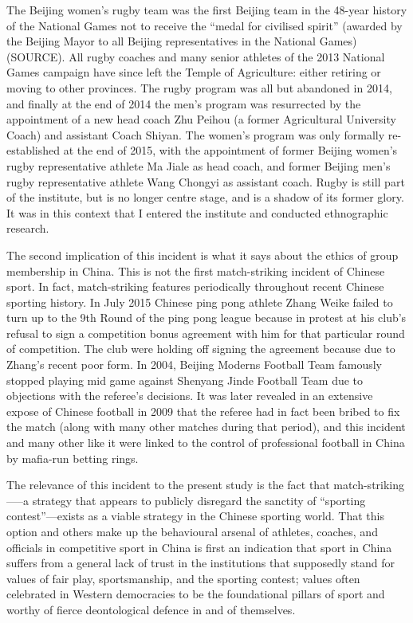 {The Beijing women's rugby team was the first Beijing team in the 48-year history of the National Games not to receive the ``medal for civilised spirit''  (awarded by the Beijing Mayor to all Beijing representatives in the National Games) (SOURCE).  All rugby coaches and many senior athletes of the 2013 National Games campaign have since left the Temple of Agriculture: either retiring or moving to other provinces.  The rugby program was all but abandoned in 2014, and finally at the end of 2014 the men's program was resurrected by the appointment of a new head coach Zhu Peihou (a former Agricultural University Coach) and assistant Coach Shiyan.  The women's program was only formally re-established at the end of 2015, with the appointment of former Beijing women's rugby representative athlete Ma Jiale as head coach, and former Beijing men's rugby representative athlete Wang Chongyi as assistant coach.  Rugby is still part of the institute, but is no longer centre stage, and is a shadow of its former glory.  It was in this context that I entered the institute and conducted ethnographic research.

The second implication of this incident is what it says about the ethics of group membership in China.  This is not the first match-striking incident of Chinese sport. In fact, match-striking features periodically throughout recent Chinese sporting history.  In July 2015 Chinese ping pong athlete Zhang Weike failed to turn up to the 9th Round of the ping pong league because in protest at his club's refusal to sign a competition bonus agreement with him for that particular round of competition. The club were holding off signing the agreement because due to Zhang's recent poor form.  In 2004, Beijing Moderns Football Team famously stopped playing mid game against Shenyang Jinde Football Team due to objections with the referee's decisions. It was later revealed in an extensive expose of Chinese football in 2009 that the referee had in fact been bribed to fix the match (along with many other matches during that period), and this incident and many other like it were linked to the control of professional football in China by mafia-run betting rings.

The relevance of this incident to the present study is the fact that match-striking—--a strategy that appears to publicly disregard the sanctity of ``sporting contest''---exists as a viable strategy in the Chinese sporting world. That this option and others make up the behavioural arsenal of athletes, coaches, and officials in competitive sport in China is first an indication that sport in China suffers from a general lack of trust in the institutions that supposedly stand for values of fair play, sportsmanship, and the sporting contest; values often celebrated in Western democracies to be the foundational pillars of sport and worthy of fierce deontological defence in and of themselves\citep{Morris2004,Gold2002,Yuki2005}.

}
